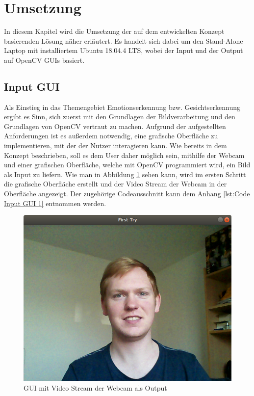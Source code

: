\documentclass[12pt, a4paper]{report}
\begin{document}
\section{Umsetzung}
In diesem Kapitel wird die Umsetzung der auf dem entwickelten Konzept basierenden Lösung näher erläutert. Es handelt sich dabei um den Stand-Alone Laptop mit installiertem Ubuntu 18.04.4 LTS, wobei der Input und der Output auf OpenCV GUIs basiert.

\subsection{Input GUI}
Als Einstieg in das Themengebiet Emotionserkennung bzw. Gesichtserkennung ergibt es Sinn, sich zuerst mit den Grundlagen der Bildverarbeitung und den Grundlagen von OpenCV vertraut zu machen. Aufgrund der aufgestellten Anforderungen ist es außerdem notwendig, eine grafische Oberfläche zu implementieren, mit der der Nutzer interagieren kann. Wie bereits in dem Konzept beschrieben, soll es dem User daher möglich sein, mithilfe der Webcam und einer grafischen Oberfläche, welche mit OpenCV programmiert wird, ein Bild als Input zu liefern. Wie man in Abbildung \ref{fig:Input GUI 1} sehen kann, wird im ersten Schritt die grafische Oberfläche erstellt und der Video Stream der Webcam in der Oberfläche angezeigt. Der zugehörige Codeausschnitt kann dem Anhang \ref{lst:Code Input GUI 1} entnommen werden.
\begin{figure}[h]
\includegraphics[width=\linewidth]{Bilder/InputGUI1.png}
\caption{GUI mit Video Stream der Webcam als Output}
\label{fig:Input GUI 1}
\end{figure}
\end{document}
